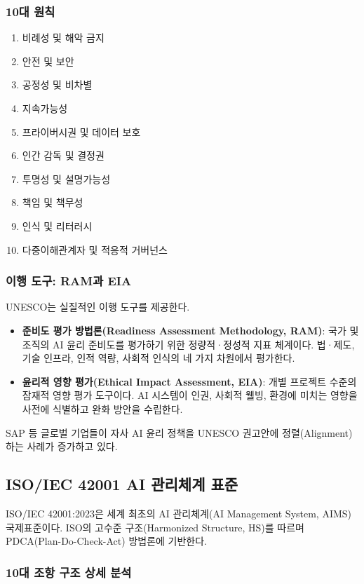 \subsubsection*{10대 원칙}
\begin{enumerate}
 \item 비례성 및 해악 금지
 \item 안전 및 보안
 \item 공정성 및 비차별
 \item 지속가능성
 \item 프라이버시권 및 데이터 보호
 \item 인간 감독 및 결정권
 \item 투명성 및 설명가능성
 \item 책임 및 책무성
 \item 인식 및 리터러시
 \item 다중이해관계자 및 적응적 거버넌스
\end{enumerate}

\subsubsection*{이행 도구: RAM과 EIA}
UNESCO는 실질적인 이행 도구를 제공한다.
\begin{itemize}
 \item \textbf{준비도 평가 방법론(Readiness Assessment Methodology, RAM)}: 국가 및 조직의 AI 윤리 준비도를 평가하기 위한 정량적·정성적 지표 체계이다. 법·제도, 기술 인프라, 인적 역량, 사회적 인식의 네 가지 차원에서 평가한다.
 \item \textbf{윤리적 영향 평가(Ethical Impact Assessment, EIA)}: 개별 프로젝트 수준의 잠재적 영향 평가 도구이다. AI 시스템이 인권, 사회적 웰빙, 환경에 미치는 영향을 사전에 식별하고 완화 방안을 수립한다.
\end{itemize}
SAP 등 글로벌 기업들이 자사 AI 윤리 정책을 UNESCO 권고안에 정렬(Alignment)하는 사례가 증가하고 있다.

\subsection{ISO/IEC 42001 AI 관리체계 표준}
ISO/IEC 42001:2023은 세계 최초의 AI 관리체계(AI Management System, AIMS) 국제표준이다.\cite{iso42001} ISO의 고수준 구조(Harmonized Structure, HS)를 따르며 PDCA(Plan-Do-Check-Act) 방법론에 기반한다.

\subsubsection{10대 조항 구조 상세 분석}

